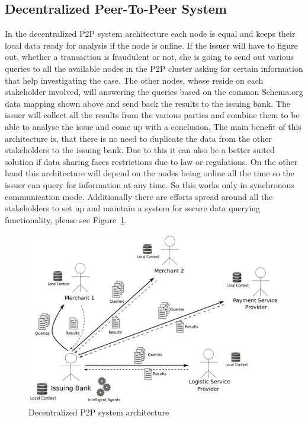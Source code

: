 \subsection{Decentralized Peer-To-Peer System}
\label{subsec:p2p_decentralized_system}

In the decentralized P2P system architecture each node is equal and keeps their local data ready for analysis if the node is online. If the issuer will have to figure out, whether a transaction is fraudulent or not, she is going to send out various queries to all the available nodes in the P2P cluster asking for certain information that help investigating the case. The other nodes, whose reside on each stakeholder involved, will answering the queries based on the common Schema.org data mapping shown above and send back the results to the issuing bank. The issuer will collect all the results from the various parties and combine them to be able to analyse the issue and come up with a conclusion. The main benefit of this architecture is, that there is no need to duplicate the data from the other stakeholders to the issuing bank. Due to this it can also be a better suited solution if data sharing faces restrictions due to law or regulations. On the other hand this architecture will depend on the nodes being online all the time so the issuer can query for information at any time. So this works only in synchronous communication mode. Additionally there are efforts spread around all the stakeholders to set up and maintain a system for secure data querying functionality, please see Figure~\ref{fig:images_p2p_decentralized}.

\begin{figure}[H]
	\centering
		\includegraphics[width=0.8\columnwidth]{images/system_P2P_decentralized.pdf}
	\caption{Decentralized P2P system architecture}
\label{fig:images_p2p_decentralized}
\end{figure}




